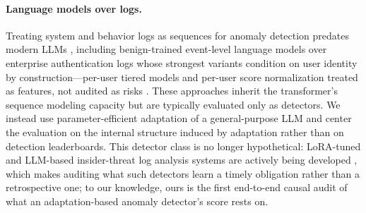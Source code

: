 \documentclass[10pt]{article} %
\begin{document}
\paragraph{Language models over logs.}
Treating system and behavior logs as sequences for anomaly detection predates
modern LLMs \citep{du2017deeplog,guo2021logbert}, including benign-trained
event-level language models over enterprise authentication logs whose
strongest variants condition on user identity by construction---per-user
tiered models and per-user score normalization treated as features, not
audited as risks \citep{tuor2018recurrent}. These approaches inherit the
transformer's sequence modeling capacity \citep{vaswani2017attention} but are
typically evaluated only as detectors. We instead use parameter-efficient
adaptation \citep{hu2022lora,dettmers2023qlora} of a general-purpose LLM
\citep{qwen3} and center the evaluation on the internal structure induced by
adaptation rather than on detection leaderboards. This detector class is no
longer hypothetical: LoRA-tuned and LLM-based insider-threat log analysis
systems are actively being developed \citep{song2025dmfi,sun2025redchronos},
which makes auditing what such detectors learn a timely obligation rather
than a retrospective one; to our knowledge, ours is the first end-to-end
causal audit of what an adaptation-based anomaly detector's score rests
on.
\end{document}
